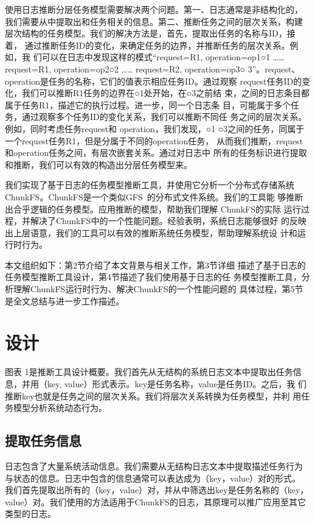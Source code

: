 使用日志推断分层任务模型需要解决两个问题。第一、日志通常是非结构化的，
我们需要从中提取出和任务相关的信息。第二、推断任务之间的层次关系，构建
层次结构的任务模型。我们的解决方法是，首先，提取出任务的名称与ID，接着，
通过推断任务ID的变化，来确定任务的边界，并推断任务的层次关系。例如，我
们可以在日志中发现这样的模式“request=R1, operation=op1○1 ……
request=R1, operation=op2○2 …… request=R2, operation=op3○
3”。request、operation是任务的名称，它们的值表示相应任务ID。通过观察
request任务ID的变化，我们可以推断R1任务的边界在○1处开始，在○3之前结
束，之间的日志条目都属于任务R1，描述它的执行过程。进一步，同一个日志条
目，可能属于多个任务，通过观察多个任务ID的变化关系，我们可以推断不同任
务之间的层次关系。例如，同时考虑任务request和 operation，我们发现，○1
○3之间的任务，同属于一个request任务R1，但是分属于不同的operation任务，
从而我们推断，request和operation任务之间，有层次嵌套关系。通过对日志中
所有的任务标识进行提取和推断，我们可以有效的构造出分层任务模型来。

我们实现了基于日志的任务模型推断工具，并使用它分析一个分布式存储系统
ChunkFS。ChunkFS是一个类似GFS~\cite{gfs}的分布式文件系统。我们的工具能
够推断出合乎逻辑的任务模型。应用推断的模型，帮助我们理解 ChunkFS的实际
运行过程，并解决了ChunkFS中的一个性能问题。经验表明，系统日志能够很好
的反映出上层语意，我们的工具可以有效的推断系统任务模型，帮助理解系统设
计和运行时行为。

本文组织如下：第2节介绍了本文背景与相关工作，第3节详细
描述了基于日志的任务模型推断工具设计，第4节描述了我们使用基于日志的任
务模型推断工具，分析理解ChunkFS运行时行为、解决ChunkFS的一个性能问题的
具体过程，第5节是全文总结与进一步工作描述。

\section{设计}

图表 1是推断工具设计概要。我们首先从无结构的系统日志文本中提取出任务信
息，并用（key, value）形式表示。key是任务名称，value是任务ID。之后，我
们推断key也就是任务之间的层次关系。我们将层次关系转换为任务模型，并利
用任务模型分析系统动态行为。

\subsection{提取任务信息}

日志包含了大量系统活动信息。我们需要从无结构日志文本中提取描述任务行为
与状态的信息。日志中包含的信息通常可以表达成为（key，value）对的形式。
我们首先提取出所有的（key，value）对，并从中筛选出key是任务名称的（key，
value）对。我们使用的方法适用于ChunkFS的日志，其原理可以推广应用至其它
类型的日志。

